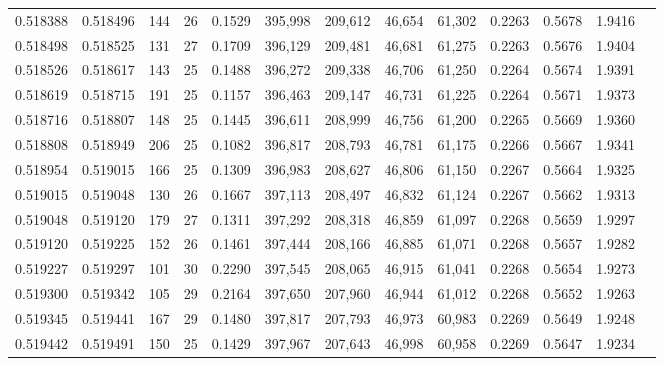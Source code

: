 \begin{tabular}{rrrrrrrrrrrrr}
0.518388 & 0.518496 & 144 &  26 &                                     0.1529 & 395,998 & 209,612 &  46,654 &  61,302 & 0.2263 & 0.5678 & 1.9416 \\
0.518498 & 0.518525 & 131 &  27 &                                     0.1709 & 396,129 & 209,481 &  46,681 &  61,275 & 0.2263 & 0.5676 & 1.9404 \\
0.518526 & 0.518617 & 143 &  25 &                                     0.1488 & 396,272 & 209,338 &  46,706 &  61,250 & 0.2264 & 0.5674 & 1.9391 \\
0.518619 & 0.518715 & 191 &  25 &                                     0.1157 & 396,463 & 209,147 &  46,731 &  61,225 & 0.2264 & 0.5671 & 1.9373 \\
0.518716 & 0.518807 & 148 &  25 &                                     0.1445 & 396,611 & 208,999 &  46,756 &  61,200 & 0.2265 & 0.5669 & 1.9360 \\
0.518808 & 0.518949 & 206 &  25 &                                     0.1082 & 396,817 & 208,793 &  46,781 &  61,175 & 0.2266 & 0.5667 & 1.9341 \\
0.518954 & 0.519015 & 166 &  25 &                                     0.1309 & 396,983 & 208,627 &  46,806 &  61,150 & 0.2267 & 0.5664 & 1.9325 \\
0.519015 & 0.519048 & 130 &  26 &                                     0.1667 & 397,113 & 208,497 &  46,832 &  61,124 & 0.2267 & 0.5662 & 1.9313 \\
0.519048 & 0.519120 & 179 &  27 &                                     0.1311 & 397,292 & 208,318 &  46,859 &  61,097 & 0.2268 & 0.5659 & 1.9297 \\
0.519120 & 0.519225 & 152 &  26 &                                     0.1461 & 397,444 & 208,166 &  46,885 &  61,071 & 0.2268 & 0.5657 & 1.9282 \\
0.519227 & 0.519297 & 101 &  30 &                                     0.2290 & 397,545 & 208,065 &  46,915 &  61,041 & 0.2268 & 0.5654 & 1.9273 \\
0.519300 & 0.519342 & 105 &  29 &                                     0.2164 & 397,650 & 207,960 &  46,944 &  61,012 & 0.2268 & 0.5652 & 1.9263 \\
0.519345 & 0.519441 & 167 &  29 &                                     0.1480 & 397,817 & 207,793 &  46,973 &  60,983 & 0.2269 & 0.5649 & 1.9248 \\
0.519442 & 0.519491 & 150 &  25 &                                     0.1429 & 397,967 & 207,643 &  46,998 &  60,958 & 0.2269 & 0.5647 & 1.9234 \\

\end{tabular}
